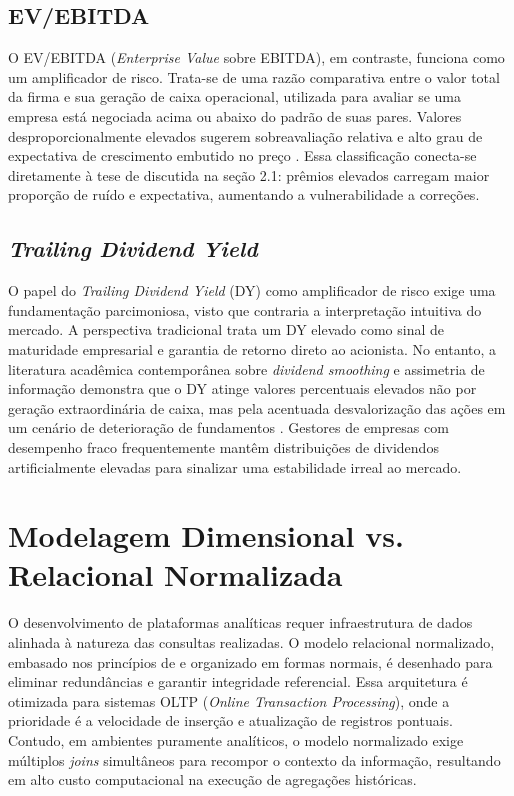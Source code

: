 \subsection{EV/EBITDA}
O EV/EBITDA (\textit{Enterprise Value} sobre EBITDA), em contraste, funciona como um amplificador de risco. Trata-se de uma razão comparativa entre o valor total da firma e sua geração de caixa operacional, utilizada para avaliar se uma empresa está negociada acima ou abaixo do padrão de suas pares. Valores desproporcionalmente elevados sugerem sobreavaliação relativa e alto grau de expectativa de crescimento embutido no preço \cite{Zaremba2019And}. Essa classificação conecta-se diretamente à tese de  discutida na seção 2.1: prêmios elevados carregam maior proporção de ruído e expectativa, aumentando a vulnerabilidade a correções.

\subsection{\textit{Trailing Dividend Yield}}
O papel do \textit{Trailing Dividend Yield} (DY) como amplificador de risco exige uma fundamentação parcimoniosa, visto que contraria a interpretação intuitiva do mercado. A perspectiva tradicional \cite{Rozeff1984Dividend} trata um DY elevado como sinal de maturidade empresarial e garantia de retorno direto ao acionista. No entanto, a literatura acadêmica contemporânea sobre \textit{dividend smoothing} e assimetria de informação demonstra que o DY atinge valores percentuais elevados não por geração extraordinária de caixa, mas pela acentuada desvalorização das ações em um cenário de deterioração de fundamentos \cite{ALI2022169}. Gestores de empresas com desempenho fraco frequentemente mantêm distribuições de dividendos artificialmente elevadas para sinalizar uma estabilidade irreal ao mercado.

\section{Modelagem Dimensional vs. Relacional Normalizada}
O desenvolvimento de plataformas analíticas requer infraestrutura de dados alinhada à natureza das consultas realizadas. O modelo relacional normalizado, embasado nos princípios de  e organizado em formas normais, é desenhado para eliminar redundâncias e garantir integridade referencial. Essa arquitetura é otimizada para sistemas OLTP (\textit{Online Transaction Processing}), onde a prioridade é a velocidade de inserção e atualização de registros pontuais. Contudo, em ambientes puramente analíticos, o modelo normalizado exige múltiplos \textit{joins} simultâneos para recompor o contexto da informação, resultando em alto custo computacional na execução de agregações históricas.

